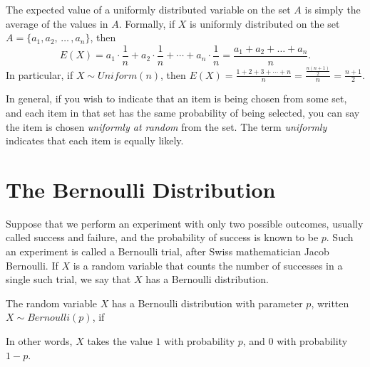 \begin{center}
\end{center}

The expected value of a uniformly distributed variable on the set $A$ is simply the average of the values in $A$. Formally, if $X$ is uniformly distributed on the set $A = \{a_1, a_2,\, \dots \, , a_n\}$, then
$$E(X) = a_1 \cdot \textstyle\frac{1}{n} + a_2 \cdot \frac{1}{n} + \cdots + a_n \cdot \frac{1}{n} = \frac{a_1 + a_2 + \dots + a_n}{n}.$$
In particular, if $X \sim Uniform(n)$, then $E(X) = \frac{1+2+3+\cdots+n}{n} = \frac{\frac{n(n+1)}{2}}{n} = \frac{n+1}{2}$.
\par
\rmk In general, if you wish to indicate that an item is being chosen from some set, and each item in that set has the same probability of being selected, you can say the item is chosen \emph{uniformly at random} from the set. The term \emph{uniformly} indicates that each item is equally likely.

\section{The Bernoulli Distribution}\label{BernoulliDist}

Suppose that we perform an experiment with only two possible outcomes, usually called success and failure, and the probability of success is known to be $p$. Such an experiment is called a Bernoulli trial, after Swiss mathematician Jacob Bernoulli. If $X$ is a random variable that counts the number of successes in a single such trial, we say that $X$ has a Bernoulli distribution.

\begin{defn}The random variable $X$ has a Bernoulli distribution with parameter $p$, written $X \sim Bernoulli(p)$, if
\renewcommand*{\arraystretch}{1.35}
\renewcommand*{\arraystretch}{1}
\par
\noindent In other words, $X$ takes the value $1$ with probability $p$, and $0$ with probability $1-p$.
\end{defn}

